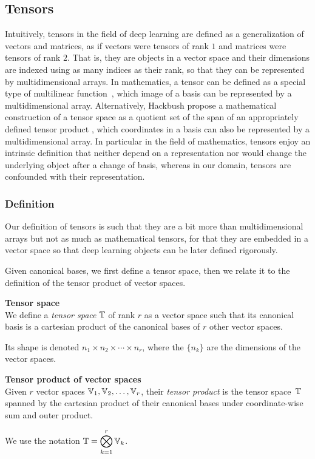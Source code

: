 \subsection{Tensors}

Intuitively, tensors in the field of deep learning are defined as a generalization of vectors and matrices, as if vectors were tensors of rank $1$ and matrices were tensors of rank $2$. That is, they are objects in a vector space and their dimensions are indexed using as many indices as their rank, so that they can be represented by multidimensional arrays. In mathematics, a tensor can be defined as a special type of multilinear function~\citep{bass1968cours, marcus1975finite, williamson2015tensor}, which image of a basis can be represented by a multidimensional array. Alternatively, Hackbush propose a mathematical construction of a tensor space as a quotient set of the span of an appropriately defined tensor product \citep{hackbusch2012tensor}, which coordinates in a basis can also be represented by a multidimensional array. In particular in the field of mathematics, tensors enjoy an intrinsic definition that neither depend on a representation nor would change the underlying object after a change of basis, whereas in our domain, tensors are confounded with their representation.

\subsubsection{Definition}

Our definition of tensors is such that they are a bit more than multidimensional arrays but not as much as mathematical tensors, for that they are embedded in a vector space so that deep learning objects can be later defined rigorously.

Given canonical bases, we first define a tensor space, then we relate it to the definition of the tensor product of vector spaces.

\begin{definition}\textbf{Tensor space}\\
We define a \emph{tensor space} $\mathbb{T}$ of rank $r$ as a vector space such that its canonical basis is a cartesian product of the canonical bases of $r$ other vector spaces.

Its shape is denoted $n_1 \times n_2 \times \cdots \times n_r$, where the $\{n_k\}$ are the dimensions of the vector spaces.
\end{definition}

\begin{definition}\textbf{Tensor product of vector spaces}\\
Given $r$ vector spaces $\mathbb{V}_1, \mathbb{V}_2, \ldots, \mathbb{V}_r$, their \emph{tensor product} is the tensor space~$\mathbb{T}$ spanned by the cartesian product of their canonical bases under coordinate-wise sum and outer product.

We use the notation $\mathbb{T} = \displaystyle \bigotimes_{k=1}^r \mathbb{V}_k$.
\end{definition}

